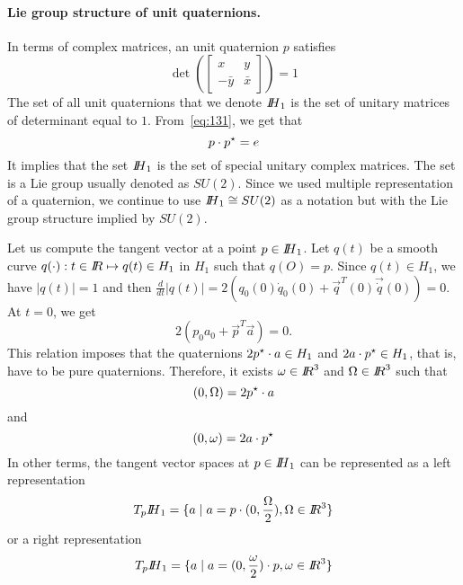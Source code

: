 \paragraph{Lie group structure of unit quaternions.} In terms of complex matrices, an unit quaternion $p$ satisfies
\begin{equation}
  \label{eq:125}
  \det\left(    \begin{bmatrix}
      x &y  \\
      - \bar y  & \bar x
    \end{bmatrix} \right) =1
\end{equation}
The set of all unit quaternions that we denote $\mbox{\rm $I\!\!H$}_1$ is the set of unitary matrices of determinant equal to $1$. From~\eqref{eq:131}, we get that
\begin{equation}
  \label{eq:126}
  p \cdot p^\star = e  
\end{equation}
It implies that the set $\mbox{\rm $I\!\!H$}_1$ is the set of special unitary complex matrices. The set is a Lie group usually denoted as $SU(2)$. Since we used multiple representation of a quaternion, we continue to use $\mbox{\rm $I\!\!H$}_1 \cong SU(2)$ as a notation but with the Lie group structure implied by $SU(2)$.

Let us compute the tangent vector at a point $p \in \mbox{\rm $I\!\!H$}_1$. Let $q(t)$ be  a smooth curve $q(\cdot) : t\in \mbox{\rm $I\!\!R$} \mapsto q(t)\in H_1$ in $H_1$ such that $q(O)= p$.
Since $q(t)\in H_1$, we have $|q(t)|=1$ and then $\frac{d}{dt} |q(t)| = 2(q_0(0) \dot q_0(0) + \vec{q}^T(0) \vec{\dot q}(0) ) =0$. At $t=0$, we get
\begin{equation}
  \label{eq:48}
  2(p_0 a_0 + \vec{p}^T \vec{a})= 0.
\end{equation}
This relation imposes that the quaternions $2 p^\star \cdot a \in H_1$ and $2 a \cdot p^\star \in H_1$, that is, have to be pure quaternions. Therefore, it exists $\omega \in \mbox{\rm $I\!\!R$}^3$  and $\Omega \in \mbox{\rm $I\!\!R$}^3$ such that
\begin{equation}
  \label{eq:132}
  (0, \Omega) = 2 p ^\star \cdot a 
\end{equation}
and
\begin{equation}
  \label{eq:132}
  (0, \omega) = 2 a\cdot p^\star
\end{equation}
In other terms, the tangent vector spaces at $p \in \mbox{\rm $I\!\!H$}_1$ can be represented as a left representation
\begin{equation}
  \label{eq:133}
  T_p\mbox{\rm $I\!\!H$}_1 = \{ a \mid a = p \cdot (0, \frac \Omega 2 ), \Omega \in \mbox{\rm $I\!\!R$}^3\}
\end{equation}
or a right representation
\begin{equation}
  \label{eq:1330}
  T_p{\mbox{\rm $I\!\!H$}_1} = \{ a \mid a =  (0, \frac \omega 2 ) \cdot p, \omega \in \mbox{\rm $I\!\!R$}^3\}
\end{equation}

